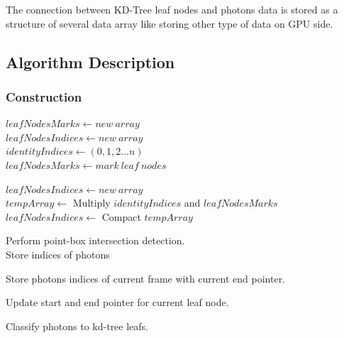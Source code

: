 The connection between KD-Tree leaf nodes and photons data is stored as a structure of several data array like storing other type of data on GPU side. 

\subsection{Algorithm Description} 

\subsubsection{Construction}  

\begin{algorithm}[H]
	\SetAlgoLined

	\( leafNodesMarks \leftarrow new\ array  \) \\
	\( leafNodesIndices \leftarrow new\ array  \) \\
	\( identityIndices \leftarrow (0, 1, 2 ... n) \) \\ 

	 {
		\( leafNodesMarks \leftarrow mark\ leaf\ nodes  \) \\
	}

	\( leafNodesIndices \leftarrow new\ array  \) \\
	\(tempArray \leftarrow \) Multiply \(identityIndices\) and \(leafNodesMarks\)
	\( leafNodesIndices \leftarrow \) Compact \( tempArray \)
	 
	 {
		 {
			Perform point-box intersection detection. \\ 
			Store indices of photons 
		}
	}
	
	 {
		 {
			Store photons indices of current frame with current end pointer. 
		}

		Update start and end pointer for current leaf node.
	}
	
	\caption{Classify photons to kd-tree leafs. } 	
	\label{algo:build_kdleaf_photons} 
\end{algorithm}

 \vspace{20pt}

